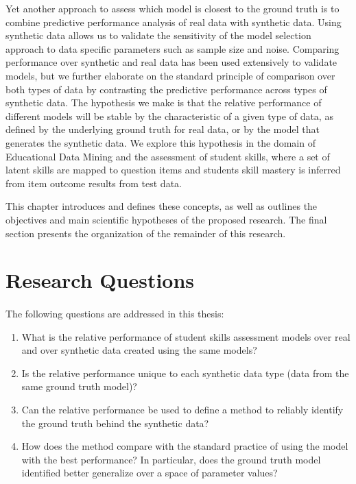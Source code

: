 Yet another approach to assess which model is closest to the ground truth is to combine predictive performance analysis of real data with synthetic data. Using synthetic data allows us to validate the sensitivity of the model selection approach to data specific parameters such as sample size and noise. Comparing performance over synthetic and real data has been used extensively to validate models, but we further elaborate on the standard principle of comparison over both types of data by contrasting the predictive performance across types of synthetic data.  The hypothesis we make is that the relative performance of different models will be stable by the characteristic of a given type of data, as defined by the underlying ground truth for real data, or by the model that generates the synthetic data.  We explore this hypothesis in the domain of Educational Data Mining and the assessment of student skills, where a set of latent skills are mapped to question items and students skill mastery is inferred from item outcome results from test data. 


This chapter introduces and defines these concepts, as well as outlines the objectives and main scientific hypotheses of the proposed research. The final section presents the organization of the remainder of this research.


\section{Research Questions}
\paragraph{}The following questions are addressed in this thesis:

\begin{enumerate}
\item What is the relative performance of student skills assessment models over real and over synthetic data created using the same models?
\item Is the relative performance unique to each synthetic data type (data from the same ground truth model)?
\item Can the relative performance be used to define a method to reliably identify the ground truth behind the synthetic data?
\item How does the method compare with the standard practice of using the model with the best performance?  In particular, does the ground truth model identified better generalize over a space of parameter values?
\end{enumerate}


